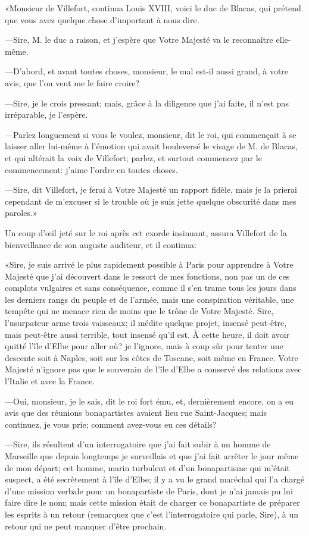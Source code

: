«Monsieur de Villefort, continua Louis XVIII, voici le duc de Blacas, qui prétend que vous avez quelque chose d'important à nous dire.

—Sire, M. le duc a raison, et j'espère que Votre Majesté va le reconnaître elle-même.

—D'abord, et avant toutes choses, monsieur, le mal est-il aussi grand, à votre avis, que l'on veut me le faire croire?

—Sire, je le crois pressant; mais, grâce à la diligence que j'ai faite, il n'est pas irréparable, je l'espère.

—Parlez longuement si vous le voulez, monsieur, dit le roi, qui commençait à se laisser aller lui-même à l'émotion qui avait bouleversé le visage de M. de Blacas, et qui altérait la voix de Villefort; parlez, et surtout commencez par le commencement: j'aime l'ordre en toutes choses.

—Sire, dit Villefort, je ferai à Votre Majesté un rapport fidèle, mais je la prierai cependant de m'excuser si le trouble où je suis jette quelque obscurité dans mes paroles.»

Un coup d'œil jeté sur le roi après cet exorde insinuant, assura Villefort de la bienveillance de son auguste auditeur, et il continua:

«Sire, je suis arrivé le plus rapidement possible à Paris pour apprendre à Votre Majesté que j'ai découvert dans le ressort de mes fonctions, non pas un de ces complots vulgaires et sans conséquence, comme il s'en trame tous les jours dans les derniers rangs du peuple et de l'armée, mais une conspiration véritable, une tempête qui ne menace rien de moins que le trône de Votre Majesté. Sire, l'usurpateur arme trois vaisseaux; il médite quelque projet, insensé peut-être, mais peut-être aussi terrible, tout insensé qu'il est. À cette heure, il doit avoir quitté l'île d'Elbe pour aller où? je l'ignore, mais à coup sûr pour tenter une descente soit à Naples, soit sur les côtes de Toscane, soit même en France. Votre Majesté n'ignore pas que le souverain de l'île d'Elbe a conservé des relations avec l'Italie et avec la France.

—Oui, monsieur, je le sais, dit le roi fort ému, et, dernièrement encore, on a eu avis que des réunions bonapartistes avaient lieu rue Saint-Jacques; mais continuez, je vous prie; comment avez-vous eu ces détails?

—Sire, ils résultent d'un interrogatoire que j'ai fait subir à un homme de Marseille que depuis longtemps je surveillais et que j'ai fait arrêter le jour même de mon départ; cet homme, marin turbulent et d'un bonapartisme qui m'était suspect, a été secrètement à l'île d'Elbe; il y a vu le grand maréchal qui l'a chargé d'une mission verbale pour un bonapartiste de Paris, dont je n'ai jamais pu lui faire dire le nom; mais cette mission était de charger ce bonapartiste de préparer les esprits à un retour (remarquez que c'est l'interrogatoire qui parle, Sire), à un retour qui ne peut manquer d'être prochain.

